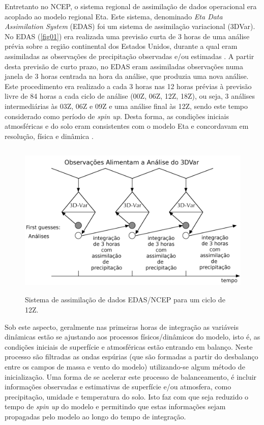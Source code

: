 Entretanto no NCEP, o sistema regional de assimilação de dados operacional era acoplado ao modelo regional Eta. Este sistema, denominado \textit{Eta Data Assimilation System} (EDAS) foi um sistema de assimilação variacional (3DVar). No EDAS (\autoref{fig01}) era realizada uma previsão curta de 3 horas de uma análise prévia sobre a região continental dos Estados Unidos, durante a qual eram assimiladas as observações de precipitação observadas e/ou estimadas \cite{messingeretal06}. A partir desta previsão de curto prazo, no EDAS eram assimiladas observações numa janela de 3 horas centrada na hora da análise, que produzia uma nova análise. Este \-pro\-ce\-di\-men\-to era realizado a cada 3 horas nas 12 horas prévias à previsão livre de 84 horas a cada ciclo de análise (00Z, 06Z, 12Z, 18Z), ou seja, 3 análises intermediárias às 03Z, 06Z e 09Z e uma análise final às 12Z, sendo este tempo considerado como período de \textit{spin up}. Desta forma, as condições iniciais atmosféricas e do solo eram consistentes com o modelo Eta e concordavam em resolução, física e dinâmica \cite{rogersetal96}. 

\begin{figure}[!ht]
\centering
\includegraphics[height=7.5cm]{./figs/edas_pt.png}
\caption{Sistema de assimilação de dados EDAS/NCEP para um ciclo de 12Z.}
\label{fig01}
\end{figure}

Sob este aspecto, geralmente nas primeiras horas de integração as variáveis dinâmicas estão se ajustando aos processos físicos/dinâmicos do modelo, isto é, as condições iniciais de superfície e atmosféricas estão entrando em balanço. Neste processo são filtradas as ondas espúrias (que são formadas a partir do desbalanço entre os campos de massa e vento do modelo) utilizando-se algum método de inicialização. Uma forma de se acelerar este processo de balanceamento, é incluir informações observadas e estimativas de superfície e/ou atmosfera, como precipitação, umidade e temperatura do solo. Isto faz com que seja reduzido o tempo de \textit{spin up} do modelo e permitindo que estas informações sejam propagadas pelo modelo ao longo do tempo de integração.

